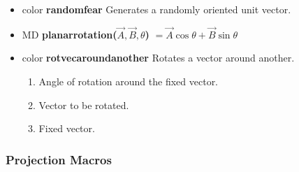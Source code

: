\begin{itemize}
\begin{enumerate}
\end{enumerate}
\item color {\bfseries randomfear} Generates a randomly
oriented unit vector.
\item MD {\bfseries planarrotation($\vec{A},\vec{B},\theta$)} $=\vec{A}\cos\theta+\vec{B}\sin\theta$
\item color {\bfseries rotvecaroundanother} Rotates a vector around
  another.
\begin{enumerate}
\item {} Angle of rotation around the fixed vector.
\item {} Vector to be rotated.
\item {} Fixed vector.
\end{enumerate}

\end{itemize}



\subsubsection{Projection Macros}


